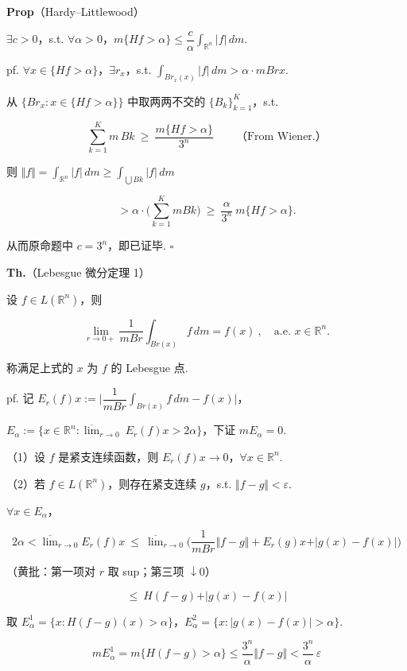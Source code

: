 \documentclass[11pt]{ctexart}
\theoremstyle{definition}
\begin{document}
\textbf{Prop}（Hardy–Littlewood）

$\exists c > 0$，s.t. $\forall \alpha > 0$，$m\{Hf > \alpha\} \leq \dfrac{c}{\alpha} \displaystyle\int_{\mathbb{R}^n} \vert f\vert \, dm$.

pf. $\forall x \in \{Hf > \alpha\}$，$\exists r_x$，s.t. $\displaystyle\int_{Br_x(x)} \vert f\vert \, dm > \alpha \cdot mBrx$.

从 $\{Br_x : x \in \{Hf > \alpha\}\}$ 中取两两不交的 $\{B_k\}_{k=1}^{K}$，s.t.

\[
\sum_{k=1}^{K} m\, Bk \ \geq\ \frac{m\{Hf > \alpha\}}{3^n} \qquad \text{（From Wiener.）}
\]

则 $\Vert f\Vert = \displaystyle\int_{\mathbb{R}^n} \vert f\vert \, dm \geq \int_{\bigcup Bk} \vert f\vert \, dm$

\[
> \alpha \cdot \Big( \sum_{k=1}^{K} mBk \Big) \ \geq\ \frac{\alpha}{3^n}\ m\{Hf > \alpha\}.
\]

从而原命题中 $c = 3^n$，即已证毕. $\square$

\textbf{Th.}（Lebesgue 微分定理 1）

设 $f \in L(\mathbb{R}^n)$，则

\[
\lim_{r \to 0+} \frac{1}{mBr} \int_{Br(x)} f \, dm = f(x) \ ,\quad \text{a.e. } x \in \mathbb{R}^n.
\]

称满足上式的 $x$ 为 $f$ 的 Lebesgue 点.

pf. 记 $E_r(f)x := \Big\vert \dfrac{1}{mBr} \int_{Br(x)} f \, dm - f(x)\Big\vert$，

$E_\alpha := \Big\{x \in \mathbb{R}^n : \overline{\lim}_{r \to 0}\ E_r(f)x > 2\alpha\Big\}$，下证 $mE_\alpha = 0$.

（1）设 $f$ 是紧支连续函数，则 $E_r(f)x \to 0$，$\forall x \in \mathbb{R}^n$.

（2）若 $f \in L(\mathbb{R}^n)$，则存在紧支连续 $g$，s.t. $\Vert f - g\Vert < \varepsilon$.

$\forall x \in E_\alpha$，

\[
2\alpha < \overline{\lim}_{r \to 0} E_r(f)x \ \leq\ \overline{\lim}_{r \to 0} \Big( \frac{1}{mBr} \Vert f - g\Vert + E_r(g)x + \vert g(x) - f(x)\vert \Big)
\]

（黄批：第一项对 $r$ 取 sup；第三项 $\downarrow 0$）

\[
\leq\ H(f - g) + \vert g(x) - f(x)\vert
\]

取 $E_\alpha^1 = \{x : H(f-g)(x) > \alpha\}$，$E_\alpha^2 = \{x : \vert g(x) - f(x)\vert > \alpha\}$.

\[
mE_\alpha^1 = m\{H(f-g) > \alpha\} \leq \frac{3^n}{\alpha} \Vert f - g\Vert < \frac{3^n}{\alpha}\, \varepsilon
\]
\end{document}

